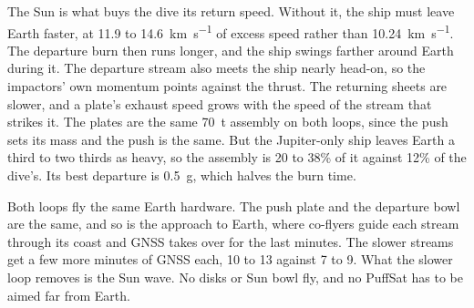 \documentclass{article}
\begin{document}
The Sun is what buys the dive its return speed. Without it, the ship must leave Earth faster, at 11.9 to \SI{14.6}{\kilo\meter\per\second} of excess speed rather than \SI{10.24}{\kilo\meter\per\second}. The departure burn then runs longer, and the ship swings farther around Earth during it. The departure stream also meets the ship nearly head-on, so the impactors' own momentum points against the thrust. The returning sheets are slower, and a plate's exhaust speed grows with the speed of the stream that strikes it. The plates are the same \SI{70}{\tonne} assembly on both loops, since the push sets its mass and the push is the same. But the Jupiter-only ship leaves Earth a third to two thirds as heavy, so the assembly is 20 to 38\% of it against 12\% of the dive's. Its best departure is 0.5~g, which halves the burn time.

Both loops fly the same Earth hardware. The push plate and the departure bowl are the same, and so is the approach to Earth, where co-flyers guide each stream through its coast and GNSS takes over for the last minutes. The slower streams get a few more minutes of GNSS each, 10 to 13 against 7 to 9. What the slower loop removes is the Sun wave. No disks or Sun bowl fly, and no PuffSat has to be aimed far from Earth.
\end{document}
